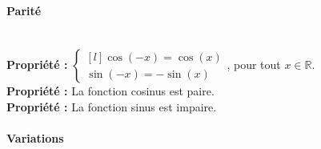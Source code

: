 \documentclass[a4paper,titlepage]{article}
\makeatletter
\def\tikzscale{1}\begin{lrbox}{\measure@tikzpicture}
\edef\tikzscale{\pgfmathresult}
\makeatother
\begin{document}
            \paragraph{Parité}\mbox{}\\
                \textbf{Propriété :} $\left\{\begin{smallmatrix*}[l]\cos\left(-x\right)=\cos\left(x\right)\\\sin\left(-x\right)=-\sin\left(x\right)\end{smallmatrix*}\!\right.$, pour tout $x\in\mathbb{R}$.
                \\
                \textbf{Propriété :} La fonction cosinus est paire.
                \\
                \textbf{Propriété :} La fonction sinus est impaire.
            \paragraph{Variations}\mbox{}\\
                \begin{scaletikzpicturetowidth}{\textwidth}
                \end{scaletikzpicturetowidth}
\end{document}

